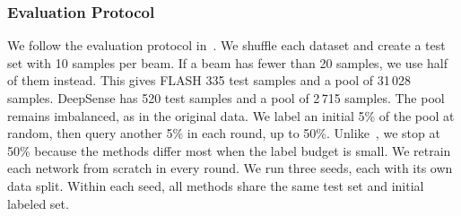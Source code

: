 \documentclass[journal,onecolumn]{IEEEtran}
\begin{document}
\subsubsection{Evaluation Protocol}

We follow the evaluation protocol in~\cite{soltani2024learning}. We shuffle each dataset and create a test set with 10 samples per beam. If a beam has fewer than 20 samples, we use half of them instead. This gives FLASH 335 test samples and a pool of 31\,028 samples. DeepSense has 520 test samples and a pool of 2\,715 samples. The pool remains imbalanced, as in the original data. We label an initial 5\% of the pool at random, then query another 5\% in each round, up to 50\%. Unlike~\cite{soltani2024learning}, we stop at 50\% because the methods differ most when the label budget is small. We retrain each network from scratch in every round. We run three seeds, each with its own data split. Within each seed, all methods share the same test set and initial labeled set.
\end{document}
